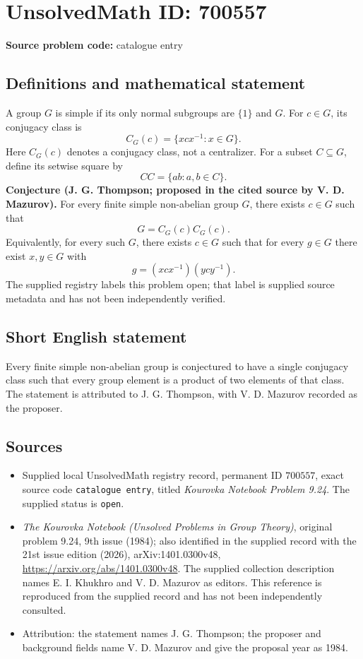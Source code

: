 \documentclass[11pt]{article}
\begin{document}
\section*{UnsolvedMath ID: 700557}
\textbf{Source problem code:} catalogue entry
\subsection{Definitions and mathematical statement}
A group \(G\) is simple if its only normal subgroups are \(\{1\}\) and \(G\). For \(c\in G\), its conjugacy class is
\[
C_G(c)=\{xcx^{-1}:x\in G\}.
\]
Here \(C_G(c)\) denotes a conjugacy class, not a centralizer. For a subset \(C\subseteq G\), define its setwise square by
\[
CC=\{ab:a,b\in C\}.
\]
\textbf{Conjecture (J. G. Thompson; proposed in the cited source by V. D. Mazurov).} For every finite simple non-abelian group \(G\), there exists \(c\in G\) such that
\[
G=C_G(c)C_G(c).
\]
Equivalently, for every such \(G\), there exists \(c\in G\) such that for every \(g\in G\) there exist \(x,y\in G\) with
\[
g=(xcx^{-1})(ycy^{-1}).
\]
The supplied registry labels this problem open; that label is supplied source metadata and has not been independently verified.
\subsection{Short English statement}
Every finite simple non-abelian group is conjectured to have a single conjugacy class such that every group element is a product of two elements of that class. The statement is attributed to J. G. Thompson, with V. D. Mazurov recorded as the proposer.
\subsection{Sources}
\begin{itemize}
\item Supplied local UnsolvedMath registry record, permanent ID \(700557\), exact source code \texttt{catalogue entry}, titled \emph{Kourovka Notebook Problem 9.24}. The supplied status is \texttt{open}.
\item \emph{The Kourovka Notebook (Unsolved Problems in Group Theory)}, original problem 9.24, 9th issue (1984); also identified in the supplied record with the 21st issue edition (2026), arXiv:1401.0300v48, \url{https://arxiv.org/abs/1401.0300v48}. The supplied collection description names E. I. Khukhro and V. D. Mazurov as editors. This reference is reproduced from the supplied record and has not been independently consulted.
\item Attribution: the statement names J. G. Thompson; the proposer and background fields name V. D. Mazurov and give the proposal year as 1984.
\end{itemize}
\end{document}
